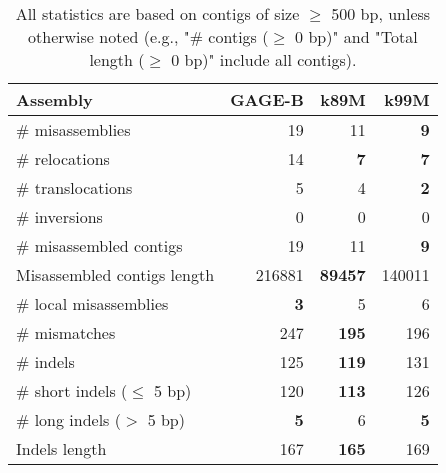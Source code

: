 \documentclass[12pt,a4paper]{article}
\begin{document}
\begin{table}[ht]
\begin{center}
\caption{All statistics are based on contigs of size $\geq$ 500 bp, unless otherwise noted (e.g., "\# contigs ($\geq$ 0 bp)" and "Total length ($\geq$ 0 bp)" include all contigs).}
\begin{tabular}{|l*{3}{|r}|}
\hline
Assembly & GAGE-B & k89M & k99M \\ \hline
\# misassemblies & 19 & 11 & {\bf 9} \\ \hline
\hspace{5mm}\# relocations & 14 & {\bf 7} & {\bf 7} \\ \hline
\hspace{5mm}\# translocations & 5 & 4 & {\bf 2} \\ \hline
\hspace{5mm}\# inversions & 0 & 0 & 0 \\ \hline
\# misassembled contigs & 19 & 11 & {\bf 9} \\ \hline
Misassembled contigs length & 216881 & {\bf 89457} & 140011 \\ \hline
\# local misassemblies & {\bf 3} & 5 & 6 \\ \hline
\# mismatches & 247 & {\bf 195} & 196 \\ \hline
\# indels & 125 & {\bf 119} & 131 \\ \hline
\hspace{5mm}\# short indels ($\leq$ 5 bp) & 120 & {\bf 113} & 126 \\ \hline
\hspace{5mm}\# long indels ($>$ 5 bp) & {\bf 5} & 6 & {\bf 5} \\ \hline
Indels length & 167 & {\bf 165} & 169 \\ \hline
\end{tabular}
\end{center}
\end{table}
\end{document}

